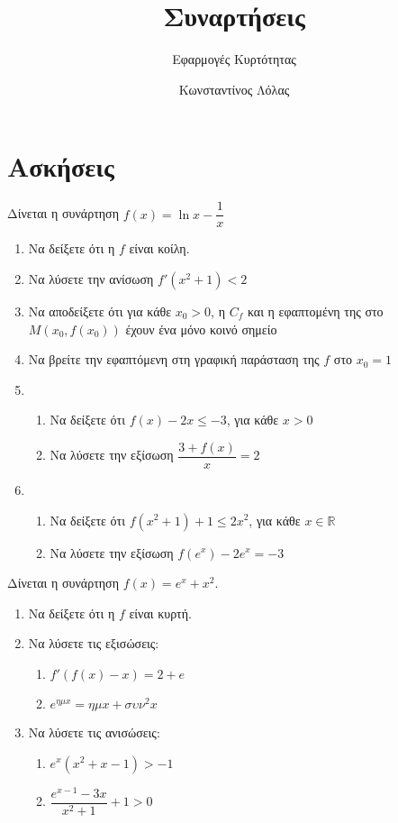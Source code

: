 \documentclass{../presentation}
\title{Συναρτήσεις}
\subtitle{Εφαρμογές Κυρτότητας}
\author[Λόλας]{Κωνσταντίνος Λόλας}
\institute[$10^ο$ ΓΕΛ]{$10^ο$ ΓΕΛ Θεσσαλονίκης}
\date{}
\begin{document}
\begin{frame}
  \titlepage
\end{frame}

\section{Ασκήσεις}

\begin{askisi}
  Δίνεται η συνάρτηση $f(x)=\ln x-\dfrac{1}{x}$
  \begin{enumerate}[<+->]
    \item Να δείξετε ότι η $f$ είναι κοίλη.
    \item Να λύσετε την ανίσωση $f'(x^2+1)<2$
    \item Να αποδείξετε ότι για κάθε $x_0>0$, η $C_f$ και η εφαπτομένη της στο $Μ(x_0,f(x_0))$ έχουν ένα μόνο κοινό σημείο
    \item Να βρείτε την εφαπτόμενη στη γραφική παράσταση της $f$ στο $x_0=1$
    \item
          \begin{enumerate}[<+->]
            \item Να δείξετε ότι $f(x)-2x\le -3$, για κάθε $x>0$
            \item Να λύσετε την εξίσωση $\dfrac{3+f(x)}{x}=2$
          \end{enumerate}
    \item
          \begin{enumerate}[<+->]
            \item Να δείξετε ότι $f(x^2+1)+1 \le 2x^2$, για κάθε $x\in\mathbb{R}$
            \item Να λύσετε την εξίσωση $f(e^x)-2e^x=-3$
          \end{enumerate}
  \end{enumerate}
\end{askisi}

\begin{askisi}
  Δίνεται η συνάρτηση $f(x)=e^x+x^2$.
  \begin{enumerate}[<+->]
    \item Να δείξετε ότι η $f$ είναι κυρτή.
    \item Να λύσετε τις εξισώσεις:
          \begin{enumerate}[<+->]
            \item $f'(f(x)-x)=2+e$
            \item $e^{ημx}=ημx+συν^2x$
          \end{enumerate}
    \item Να λύσετε τις ανισώσεις:
          \begin{enumerate}[<+->]
            \item $e^x(x^2+x-1)>-1$
            \item $\dfrac{e^{x-1}-3x}{x^2+1}+1>0$
          \end{enumerate}
  \end{enumerate}
\end{askisi}
\end{document}

